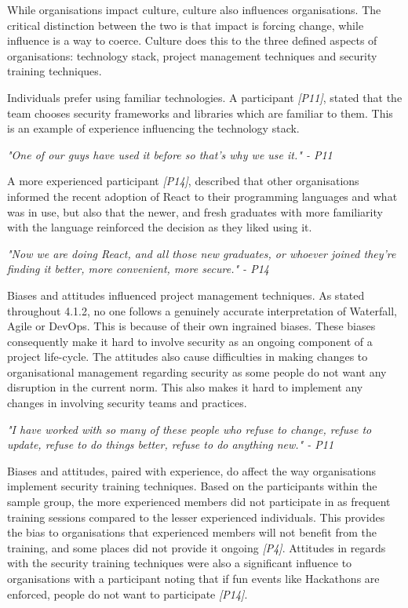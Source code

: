 While organisations impact culture, culture also influences organisations. The critical distinction between the two is that impact is forcing change, while influence is a way to coerce.   Culture does this to the three defined aspects of organisations: technology stack, project management techniques and security training techniques. 
\newline
\par
Individuals prefer using familiar technologies. A participant \textit{[P11]},  stated that the team chooses security frameworks and libraries which are familiar to them. This is an example of experience influencing the technology stack. 
\newline
\par
\textit{"One of our guys have used it before so that's why we use it." - P11}
\newline
\par
A more experienced participant \textit{[P14]}, described that other organisations informed the recent adoption of React to their programming languages and what was in use, but also that the newer, and fresh graduates with more familiarity with the language reinforced the decision as they liked using it. 
\newline
\par
\textit{"Now we are doing React, and all those new graduates, or whoever joined they're finding it better, more convenient, more secure." - P14}
\newline
\par
Biases and attitudes influenced project management techniques. As stated throughout 4.1.2, no one follows a genuinely accurate interpretation of Waterfall, Agile or DevOps. This is because of their own ingrained biases. These biases consequently make it hard to involve security as an ongoing component of a project life-cycle. The attitudes also cause difficulties in making changes to organisational management regarding security as some people do not want any disruption in the current norm. This also makes it hard to implement any changes in involving security teams and practices.
\newline
\par
\textit{"I have worked with so many of these people who refuse to change, refuse to update, refuse to do things better, refuse to do anything new." - P11}
\newline
\par
Biases and attitudes, paired with experience, do affect the way organisations implement security training techniques. Based on the participants within the sample group, the more experienced members did not participate in as frequent training sessions compared to the lesser experienced individuals. This provides the bias to organisations that experienced members will not benefit from the training, and some places did not provide it ongoing \textit{[P4]}. Attitudes in regards with the security training techniques were also a significant influence to organisations with a participant noting that if fun events like Hackathons are enforced, people do not want to participate\textit{ [P14]}.

